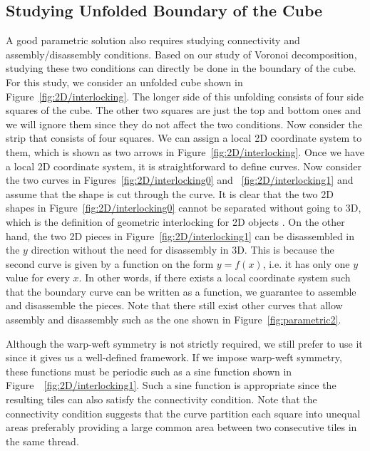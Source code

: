 \documentclass[times,twocolumn,final]{elsarticle}
\begin{document}
\subsection{Studying Unfolded Boundary of the Cube}

A good parametric solution also requires studying connectivity and assembly/disassembly conditions. Based on our study of Voronoi decomposition, studying these two conditions can directly be done in the boundary of the cube. For this study, we consider an unfolded cube shown in Figure~\ref{fig:2D/interlocking}. The longer side of this unfolding consists of four side squares of the cube. The other two squares are just the top and bottom ones and we will ignore them since they do not affect the two conditions. Now consider the strip that consists of four squares. We can assign a local 2D coordinate system to them, which is shown as two arrows in Figure~\ref{fig:2D/interlocking}. Once we have a local 2D coordinate system, it is straightforward to define curves. Now consider the two curves in  Figures~\ref{fig:2D/interlocking0} and ~\ref{fig:2D/interlocking1} and assume that the shape is cut through the curve. It is clear that the two 2D shapes in Figure~\ref{fig:2D/interlocking0} cannot be separated without going to 3D, which is the definition of geometric interlocking for 2D objects \cite{estrin2021design}. On the other hand, the two 2D pieces in Figure~\ref{fig:2D/interlocking1} can be disassembled in the $y$ direction without the need for disassembly in 3D. This is because the second curve is given by a function on the form $y=f(x)$, i.e. it has only one $y$ value for every $x$. In other words, if there exists a local coordinate system such that the boundary curve can be written as a function, we guarantee to assemble and disassemble the pieces. Note that there still exist other curves that allow assembly and disassembly such as the one shown in Figure~\ref{fig:parametric2}. 

Although the warp-weft symmetry is not strictly required, we still prefer to use it since it gives us a well-defined framework. If we impose warp-weft symmetry, these functions must be periodic such as a sine function shown in Figure~~\ref{fig:2D/interlocking1}. Such a sine function is appropriate since the resulting tiles can also satisfy the connectivity condition. Note that the connectivity condition suggests that the curve partition each square into unequal areas preferably providing a large common area between two consecutive tiles in the same thread.
\end{document}
